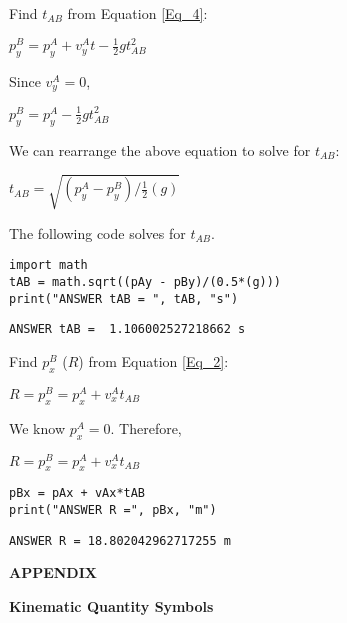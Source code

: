 \documentclass[11pt]{article}
\begin{document}
Find \(t_{AB}\) from Equation \ref{Eq_4}:

\(p^B_y = p^A_y + v^A_y t - \frac{1}{2} g t_{AB}^2\)

Since \(v^A_y = 0\), 

\(p^B_y = p^A_y - \frac{1}{2} g t_{AB}^2\)

We can rearrange the above equation to solve for \(t_{AB}\): 

\(t_{AB} = \sqrt{(p^A_y - p^B_y)/\frac{1}{2}(g)}\)

The following code solves for \(t_{AB}\).

\begin{verbatim}
import math
tAB = math.sqrt((pAy - pBy)/(0.5*(g)))
print("ANSWER tAB = ", tAB, "s")
\end{verbatim}

\begin{verbatim}
ANSWER tAB =  1.106002527218662 s
\end{verbatim}


Find \(p_x^B\) (\(R\)) from Equation \ref{Eq_2}:

\(R = p^B_x = p^A_x + v^A_x t_{AB}\)

We know \(p^A_x = 0\).  Therefore,

\(R = p^B_x = p^A_x + v^A_x t_{AB}\)

\begin{verbatim}
pBx = pAx + vAx*tAB
print("ANSWER R =", pBx, "m")
\end{verbatim}

\begin{verbatim}
ANSWER R = 18.802042962717255 m
\end{verbatim}


\textbf{APPENDIX}

\textbf{Kinematic Quantity Symbols}
\end{document}
